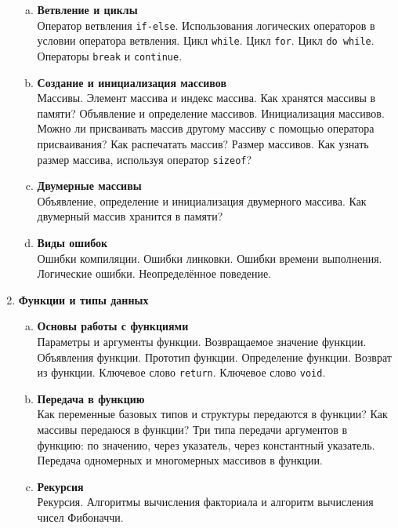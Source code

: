 \documentclass{article}
\begin{document}
\begin{enumerate}
\begin{enumerate}[a.]
\item \textbf{Ветвление и циклы}\\
Оператор ветвления \texttt{if-else}. Использования логических операторов в условии оператора ветвления.  Цикл \texttt{while}. Цикл \texttt{for}. Цикл \texttt{do while}. Операторы \texttt{break} и \texttt{continue}.

\item \textbf{Создание и инициализация массивов}\\
Массивы. Элемент массива и индекс массива. Как хранятся массивы в памяти? Объявление и определение массивов. Инициализация массивов. Можно ли присваивать массив другому массиву с помощью оператора присваивания? Как распечатать массив? Размер массивов. Как узнать размер массива, используя оператор \texttt{sizeof}?

\item \textbf{Двумерные массивы}\\
Объявление, определение и инициализация двумерного массива. Как двумерный массив хранится в памяти?

\item \textbf{Виды ошибок}\\
Ошибки компиляции. Ошибки линковки. Ошибки времени выполнения. Логические ошибки. Неопределённое поведение.
\end{enumerate}


\item \textbf{Функции и типы данных}

\begin{enumerate}[a.]
\item \textbf{Основы работы с функциями}\\
Параметры и аргументы функции. Возвращаемое значение функции. Объявления функции. Прототип функции. Определение функции.
Возврат из функции. Ключевое слово \texttt{return}. Ключевое слово \texttt{void}.

\item \textbf{Передача в функцию}\\
Как переменные базовых типов и структуры передаются в функции? Как массивы передаюся в функции? Три типа передачи аргументов в функцию: по значению, через указатель, через константный указатель. Передача одномерных и многомерных массивов в функции.

\item \textbf{Рекурсия}\\
Рекурсия. Алгоритмы вычисления факториала и алгоритм вычисления чисел Фибоначчи. 


\end{enumerate}
\end{enumerate}
\end{document}
